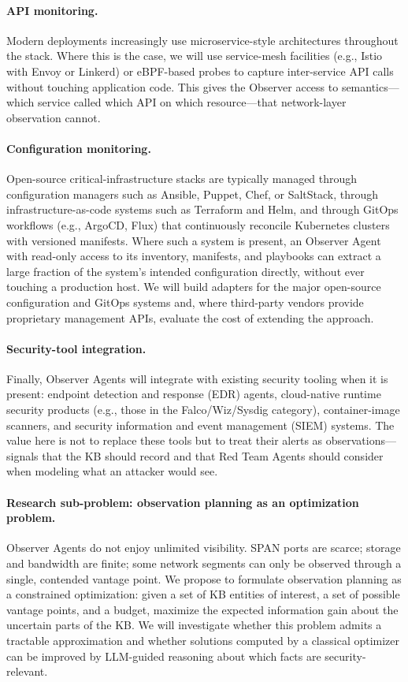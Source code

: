 \paragraph{API monitoring.}
Modern \cps deployments increasingly use microservice-style
architectures throughout the stack. Where this is the case, we
will use service-mesh facilities (e.g., Istio with Envoy or Linkerd)
or eBPF-based probes to capture inter-service API calls without
touching application code. This gives the Observer access to
semantics---which service called which API on which resource---that
network-layer observation cannot.

\paragraph{Configuration monitoring.}
Open-source critical-infrastructure stacks are typically managed
through configuration managers such as Ansible, Puppet, Chef, or
SaltStack, through infrastructure-as-code systems such as Terraform
and Helm, and through GitOps workflows (e.g., ArgoCD, Flux) that
continuously reconcile Kubernetes clusters with versioned manifests.
Where such a system is present, an Observer Agent with read-only
access to its inventory, manifests, and playbooks can extract a large
fraction of the system's intended configuration directly, without ever
touching a production host. We will build adapters for the major
open-source configuration and GitOps systems and, where third-party
vendors provide proprietary management APIs, evaluate the cost of
extending the approach.

\paragraph{Security-tool integration.}
Finally, Observer Agents will integrate with existing security tooling
when it is present: endpoint detection and response (EDR) agents,
cloud-native runtime security products (e.g., those in the
Falco/Wiz/Sysdig category), container-image scanners, and security
information and event management (SIEM) systems. The value here is
not to replace these tools but to treat their alerts as
observations---signals that the KB should record and that Red Team
Agents should consider when modeling what an attacker would see.

\paragraph{Research sub-problem: observation planning as an optimization
problem.}
Observer Agents do not enjoy unlimited visibility. SPAN ports are
scarce; storage and bandwidth are finite; some network segments can
only be observed through a single, contended vantage point. We propose
to formulate observation planning as a constrained optimization: given
a set of KB entities of interest, a set of possible vantage points,
and a budget, maximize the expected information gain about the
uncertain parts of the KB. We will investigate whether this problem
admits a tractable approximation and whether solutions computed by a
classical optimizer can be improved by LLM-guided reasoning about
which facts are security-relevant.

